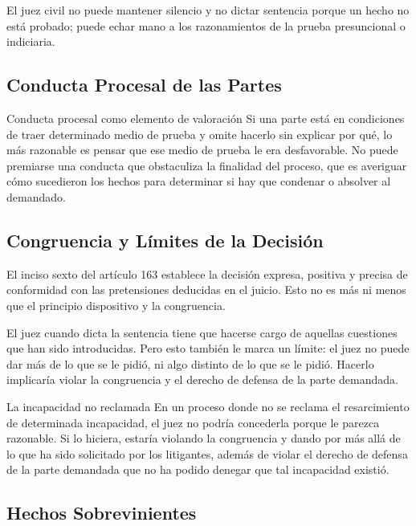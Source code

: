 \documentclass[12pt,oneside]{book}
\begin{document}
El juez civil no puede mantener silencio y no dictar sentencia porque un hecho no está probado; puede echar mano a los razonamientos de la prueba presuncional o indiciaria.

\subsection{Conducta Procesal de las Partes}

\begin{example}{Conducta procesal como elemento de valoración}
Si una parte está en condiciones de traer determinado medio de prueba y omite hacerlo sin explicar por qué, lo más razonable es pensar que ese medio de prueba le era desfavorable. No puede premiarse una conducta que obstaculiza la finalidad del proceso, que es averiguar cómo sucedieron los hechos para determinar si hay que condenar o absolver al demandado.
\end{example}

\subsection{Congruencia y Límites de la Decisión}

El inciso sexto del artículo 163 establece la decisión expresa, positiva y precisa de conformidad con las pretensiones deducidas en el juicio. Esto no es más ni menos que el principio dispositivo y la congruencia.

\begin{important}
El juez cuando dicta la sentencia tiene que hacerse cargo de aquellas cuestiones que han sido introducidas. Pero esto también le marca un límite: el juez no puede dar más de lo que se le pidió, ni algo distinto de lo que se le pidió. Hacerlo implicaría violar la congruencia y el derecho de defensa de la parte demandada.
\end{important}

\begin{example}{La incapacidad no reclamada}
En un proceso donde no se reclama el resarcimiento de determinada incapacidad, el juez no podría concederla porque le parezca razonable. Si lo hiciera, estaría violando la congruencia y dando por más allá de lo que ha sido solicitado por los litigantes, además de violar el derecho de defensa de la parte demandada que no ha podido denegar que tal incapacidad existió.
\end{example}

\subsection{Hechos Sobrevinientes}
\end{document}
